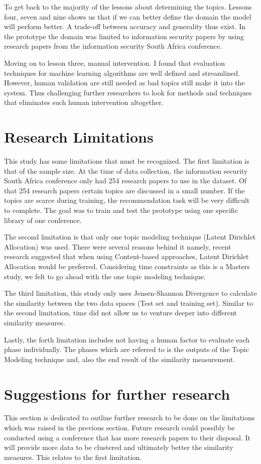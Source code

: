 To get back to the majority of the lessons about determining the topics. Lessons four, seven and nine shows us that if we can better define the domain the model will perform better. A trade-off between accuracy and generality thus exist. In the prototype the domain was limited to information security papers by using research papers from the information security South Africa conference. 

Moving on to lesson three, manual intervention. I found that evaluation techniques for machine learning algorithms are well defined and streamlined. However, human validation are still needed as bad topics still make it into the system. Thus challenging further researchers to look for methods and techniques that eliminates such human intervention altogether. 

\section{Research Limitations}
This study has some limitations that must be recognized. The first limitation is that of the sample size. At the time of data collection, the information security South Africa conference only had 254 research papers to use in the dataset. Of that 254 research papers certain topics are discussed in a small number. If the topics are scarce during training, the recommendation task will be very difficult to complete. The goal was to train and test the prototype using one specific library of one conference.

The second limitation is that only one topic modeling technique (Latent Dirichlet Allocation) was used. There were several reasons behind it namely, recent research suggested that when using Content-based approaches, Latent Dirichlet Allocation would be preferred. 
Considering time constraints as this is a Masters study, we felt to go ahead with the one topic modeling technique.

The third limitation, this study only uses Jensen-Shannon Divergence to calculate the similarity between the two data spaces (Test set and training set). Similar to the second limitation, time did not allow us to venture deeper into different similarity measures.

Lastly, the forth limitation includes not having a human factor to evaluate each phase individually. The phases which are referred to is the outputs of the Topic Modeling technique and, also the end result of the similarity measurement. 

\section{Suggestions for further research}
This section is dedicated to outline further research to be done on the limitations which was raised in the previous section. Future research could possibly be conducted using a conference that has more research papers to their disposal. It will provide more data to be clustered and ultimately better the similarity measures. This relates to the first limitation.

